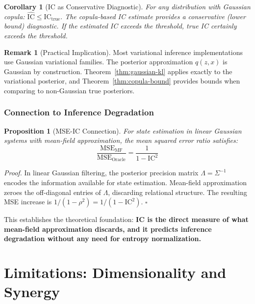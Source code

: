 \documentclass[10pt]{article} %
\theoremstyle{plain}
\newtheorem{proposition}[theorem]{Proposition}
\newtheorem{corollary}[theorem]{Corollary}
\theoremstyle{definition}
\newtheorem{remark}[theorem]{Remark}
\newcommand{\IC}{\mathrm{IC}}  %
\begin{document}
\begin{corollary}[IC as Conservative Diagnostic]
For any distribution with Gaussian copula: $\widehat{\IC} \leq \IC_{\text{true}}$. The copula-based IC estimate provides a conservative (lower bound) diagnostic. If the estimated IC exceeds the threshold, true IC certainly exceeds the threshold.
\end{corollary}

\begin{remark}[Practical Implication]
Most variational inference implementations use Gaussian variational families. The posterior approximation $q(z, x)$ is Gaussian by construction. Theorem~\ref{thm:gaussian-kl} applies exactly to the variational posterior, and Theorem~\ref{thm:copula-bound} provides bounds when comparing to non-Gaussian true posteriors.
\end{remark}

\subsubsection{Connection to Inference Degradation}

\begin{proposition}[MSE-IC Connection]
\label{prop:mse-ic}
For state estimation in linear Gaussian systems with mean-field approximation, the mean squared error ratio satisfies:
\begin{equation}
\frac{\text{MSE}_{\text{MF}}}{\text{MSE}_{\text{Oracle}}} = \frac{1}{1 - \IC^2}
\end{equation}
\end{proposition}

\noindent \emph{Proof.} In linear Gaussian filtering, the posterior precision matrix $\Lambda = \Sigma^{-1}$ encodes the information available for state estimation. Mean-field approximation zeroes the off-diagonal entries of $\Lambda$, discarding relational structure. The resulting MSE increase is $1/(1-\rho^2) = 1/(1-\IC^2)$. $\square$

\noindent This establishes the theoretical foundation: \textbf{IC is the direct measure of what mean-field approximation discards, and it predicts inference degradation without any need for entropy normalization.}

\section{Limitations: Dimensionality and Synergy}
\label{sec:risks}
\end{document}

